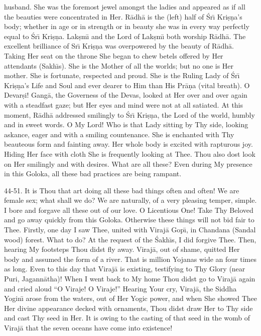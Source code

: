 husband. She was the foremost jewel amongst the ladies and appeared as if all the beauties were concentrated in Her. R\=adh\=a is the (left) half of \'Sr\={\i} Kri\d{s}\d{n}a's body; whether in age or in strength or in beauty she was in every way perfectly equal to \'Sr\={\i} Kri\d{s}\d{n}a. Lak\d{s}m\={\i} and the Lord of Lak\d{s}m\={\i} both worship R\=adh\=a. The excellent brilliance of Sr\={\i} Kri\d{s}\d{n}a was overpowered by the beauty of R\=adh\=a. Taking Her seat on the throne She began to chew betels offered by Her attendants (Sakh\={\i}s). She is the Mother of all the worlds; but no one is Her mother. She is fortunate, respected and proud. She is the Ruling Lady of \'Sr\={\i} Kri\d{s}\d{n}a's Life and Soul and ever dearer to Him than His Pr\=a\d{n}a (vital breath). O Devar\d{s}i! Gang\=a, the Governess of the Devas, looked at Her over and over again with a steadfast gaze; but Her eyes and mind were not at all satiated. At this moment, R\=adh\=a addressed smilingly to \'Sr\={\i} Kri\d{s}\d{n}a, the Lord of the world, humbly and in sweet words. O My Lord! Who is that Lady sitting by Thy side, looking askance, eager and with a smiling countenance. She is enchanted with Thy beauteous form and fainting away. Her whole body is excited with rapturous joy. Hiding Her face with cloth She is frequently looking at Thee. Thou also dost look on Her smilingly and with desires. What are all these? Even during My presence in this Goloka, all these bad practices are being rampant.

44-51. It is Thou that art doing all these bad things often and often! We are female sex; what shall we do? We are naturally, of a very pleasing temper, simple. I bore and forgave all these out of our love. O Licentious One! Take Thy Beloved and go away quickly from this Goloka. Otherwise these things will not bid fair to Thee. Firstly, one day I saw Thee, united with Viraj\=a Gop\={\i}, in Chandana (Sandal wood) forest. What to do? At the request of the \'Sakh\={\i}s, I did forgive Thee. Then, hearing My footsteps Thou didst fly away. Viraj\=a, out of shame, quitted Her body and assumed the form of a river. That is million Yojanas wide an four times as long. Even to this day that Viraj\=a is existing, testifying to Thy Glory (near Puri, Jagann\=atha)! When I went back to My home Thou didst go to Viraj\=a again and cried aloud ``O Viraje! O Viraje!'' Hearing Your cry, Viraj\=a, the Siddha Yogin\={\i} arose from the waters, out of Her Yogic power, and when She showed Thee Her divine appearance decked with ornaments, Thou didst draw Her to Thy side and cast Thy seed in Her. It is owing to the casting of that seed in the womb of Viraj\=a that the seven oceans have come into existence!

